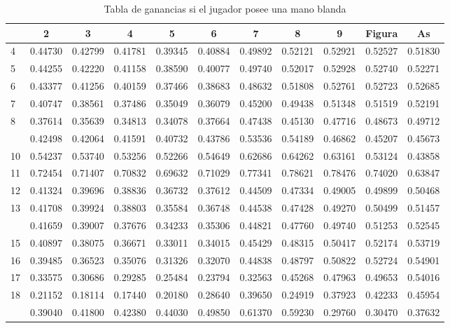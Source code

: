 \documentclass[12pt,a4paper,]{book}
\numberwithin{dummy}{section}
\theoremstyle{ocrenumbox}
\theoremstyle{blacknumex}
\theoremstyle{blacknumbox}
\theoremstyle{ocrenum}
\theoremstyle{ocrenum}
\begin{document}
\begin{longtable}[t]{lcccccccccc}
\caption{\label{tab:unnamed-chunk-74}Tabla de ganancias si el jugador posee una mano blanda}\\
\toprule
 & 2 & 3 & 4 & 5 & 6 & 7 & 8 & 9 & Figura & As\\
\midrule
4 & 0.44730 & 0.42799 & 0.41781 & 0.39345 & 0.40884 & 0.49892 & 0.52121 & 0.52921 & 0.52527 & 0.51830\\
5 & 0.44255 & 0.42220 & 0.41158 & 0.38590 & 0.40077 & 0.49740 & 0.52017 & 0.52928 & 0.52740 & 0.52271\\
6 & 0.43377 & 0.41256 & 0.40159 & 0.37466 & 0.38683 & 0.48632 & 0.51808 & 0.52761 & 0.52723 & 0.52685\\
7 & 0.40747 & 0.38561 & 0.37486 & 0.35049 & 0.36079 & 0.45200 & 0.49438 & 0.51348 & 0.51519 & 0.52191\\
8 & 0.37614 & 0.35639 & 0.34813 & 0.34078 & 0.37664 & 0.47438 & 0.45130 & 0.47716 & 0.48673 & 0.49712\\
\addlinespace
9 & 0.42498 & 0.42064 & 0.41591 & 0.40732 & 0.43786 & 0.53536 & 0.54189 & 0.46862 & 0.45207 & 0.45673\\
10 & 0.54237 & 0.53740 & 0.53256 & 0.52266 & 0.54649 & 0.62686 & 0.64262 & 0.63161 & 0.53124 & 0.43858\\
11 & 0.72454 & 0.71407 & 0.70832 & 0.69632 & 0.71029 & 0.77341 & 0.78621 & 0.78476 & 0.74020 & 0.63847\\
12 & 0.41324 & 0.39696 & 0.38836 & 0.36732 & 0.37612 & 0.44509 & 0.47334 & 0.49005 & 0.49899 & 0.50468\\
13 & 0.41708 & 0.39924 & 0.38803 & 0.35584 & 0.36748 & 0.44538 & 0.47428 & 0.49270 & 0.50499 & 0.51457\\
\addlinespace
14 & 0.41659 & 0.39007 & 0.37676 & 0.34233 & 0.35306 & 0.44821 & 0.47760 & 0.49740 & 0.51253 & 0.52545\\
15 & 0.40897 & 0.38075 & 0.36671 & 0.33011 & 0.34015 & 0.45429 & 0.48315 & 0.50417 & 0.52174 & 0.53719\\
16 & 0.39485 & 0.36523 & 0.35076 & 0.31326 & 0.32070 & 0.44838 & 0.48797 & 0.50822 & 0.52724 & 0.54901\\
17 & 0.33575 & 0.30686 & 0.29285 & 0.25484 & 0.23794 & 0.32563 & 0.45268 & 0.47963 & 0.49653 & 0.54016\\
18 & 0.21152 & 0.18114 & 0.17440 & 0.20180 & 0.28640 & 0.39650 & 0.24919 & 0.37923 & 0.42233 & 0.45954\\
\addlinespace
19 & 0.39040 & 0.41800 & 0.42380 & 0.44030 & 0.49850 & 0.61370 & 0.59230 & 0.29760 & 0.30470 & 0.37632\\

\end{longtable}
\end{document}
